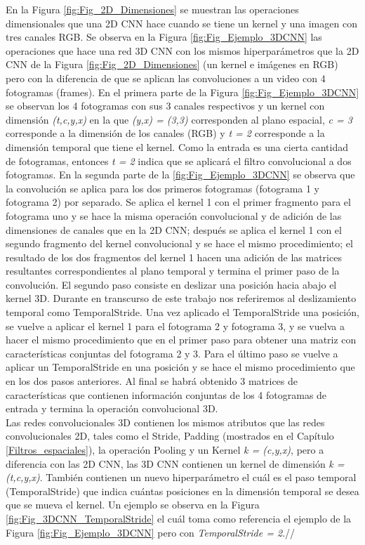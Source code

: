 \begin{onehalfspacing}
En la Figura \ref{fig:Fig_2D_Dimensiones} se muestran las operaciones dimensionales que una 2D CNN hace cuando se tiene un kernel y una imagen con tres canales RGB. Se observa en la Figura \ref{fig:Fig_Ejemplo_3DCNN} las operaciones que hace una red 3D CNN con los mismos hiperparámetros que la 2D CNN de la Figura \ref{fig:Fig_2D_Dimensiones} (un kernel e imágenes en RGB) pero con la diferencia de que se aplican las convoluciones a un video con 4 fotogramas (frames). En el primera parte de la Figura \ref{fig:Fig_Ejemplo_3DCNN} se observan los 4 fotogramas con sus 3 canales respectivos y un kernel con dimensión \textit{(t,c,y,x)} en la que \textit{(y,x) = (3,3)} corresponden al plano espacial, \textit{c = 3} corresponde a la dimensión de los canales (RGB) y \textit{t = 2} corresponde a la dimensión temporal que tiene el kernel. Como la entrada es una cierta cantidad de fotogramas, entonces \textit{t = 2} indica que se aplicará el filtro convolucional a dos fotogramas. En la segunda parte de la \ref{fig:Fig_Ejemplo_3DCNN} se observa que la convolución se aplica para los dos primeros fotogramas (fotograma 1 y fotograma 2) por separado. Se aplica el kernel 1 con el primer fragmento para el fotograma uno y se hace la misma operación convolucional y de adición de las dimensiones de canales que en la 2D CNN; después se aplica el kernel 1 con el segundo fragmento del kernel convolucional y se hace el mismo procedimiento; el resultado de los dos fragmentos del kernel 1 hacen una adición de las matrices resultantes correspondientes al plano temporal y termina el primer paso de la convolución. El segundo paso consiste en deslizar una posición hacia abajo el kernel 3D. Durante en transcurso de este trabajo nos referiremos al deslizamiento temporal como TemporalStride. Una vez aplicado el TemporalStride una posición, se vuelve a aplicar el kernel 1 para el fotograma 2 y fotograma 3, y se vuelva a hacer el mismo procedimiento que en el primer paso para obtener una matriz con características conjuntas del fotograma 2 y 3. Para el último paso se vuelve a aplicar un TemporalStride en una posición y se hace el mismo procedimiento que en los dos pasos anteriores. Al final se habrá obtenido 3 matrices de características que contienen información conjuntas de los 4 fotogramas de entrada y termina la operación convolucional 3D. \\

Las redes convolucionales 3D contienen los mismos atributos que las redes convolucionales 2D, tales como el Stride, Padding (mostrados en el Capítulo \ref{Filtros_espaciales}), la operación Pooling y un Kernel \textit{k = (c,y,x)}, pero a diferencia con las 2D CNN, las 3D CNN contienen un kernel de dimensión \textit{k = (t,c,y,x)}. También contienen un nuevo hiperparámetro el cuál es el paso temporal (TemporalStride) que indica cuántas posiciones en la dimensión temporal se desea que se mueva el kernel. Un ejemplo se observa en la Figura \ref{fig:Fig_3DCNN_TemporalStride} el cuál toma como referencia el ejemplo de la Figura \ref{fig:Fig_Ejemplo_3DCNN} pero con \textit{TemporalStride = 2}.//


\end{onehalfspacing}
